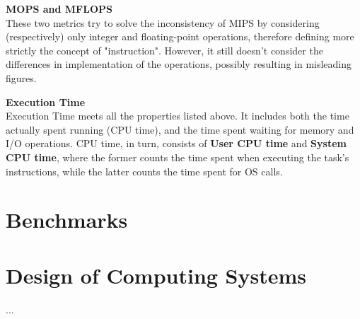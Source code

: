 \begin{example}
\textbf{MOPS and MFLOPS} \\
These two metrics try to solve the inconsistency of MIPS by considering (respectively) only integer and floating-point operations, therefore defining more strictly the concept of "instruction". However, it still doesn't consider the differences in implementation of the operations, possibly resulting in misleading figures.
\end{example}

\begin{example}
\textbf{Execution Time} \\
Execution Time meets all the properties listed above. It includes both the time actually spent running (CPU time), and the time spent waiting for memory and I/O operations. CPU time, in turn, consists of \textbf{User CPU time} and \textbf{System CPU time}, where the former counts the time spent when executing the task's instructions, while the latter counts the time spent for OS calls.
\end{example}


\section{Benchmarks}

\section{Design of Computing Systems}
...

